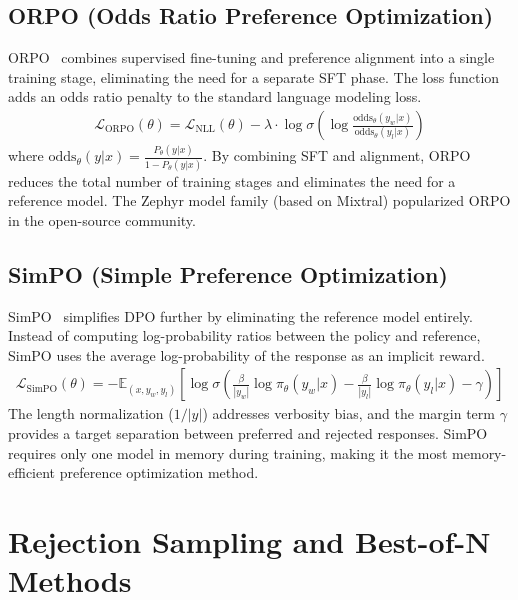 \documentclass[12pt]{article}
\begin{document}
\subsection{ORPO (Odds Ratio Preference Optimization)}

ORPO~\cite{Hong2024ORPO} combines supervised fine-tuning and preference alignment into a single training stage, eliminating the need for a separate SFT phase. The loss function adds an odds ratio penalty to the standard language modeling loss.
\begin{align}
\mathcal{L}_{\text{ORPO}}(\theta) = \mathcal{L}_{\text{NLL}}(\theta) - \lambda \cdot \log \sigma\!\left( \log \frac{\text{odds}_\theta(y_w | x)}{\text{odds}_\theta(y_l | x)} \right)
\end{align}
where $\text{odds}_\theta(y|x) = \frac{P_\theta(y|x)}{1 - P_\theta(y|x)}$. By combining SFT and alignment, ORPO reduces the total number of training stages and eliminates the need for a reference model. The Zephyr model family (based on Mixtral) popularized ORPO in the open-source community.

\subsection{SimPO (Simple Preference Optimization)}

SimPO~\cite{Meng2024SimPO} simplifies DPO further by eliminating the reference model entirely. Instead of computing log-probability ratios between the policy and reference, SimPO uses the average log-probability of the response as an implicit reward.
\begin{align}
\mathcal{L}_{\text{SimPO}}(\theta) = -\mathbb{E}_{(x, y_w, y_l)} \left[ \log \sigma\!\left( \frac{\beta}{|y_w|} \log \pi_\theta(y_w|x) - \frac{\beta}{|y_l|} \log \pi_\theta(y_l|x) - \gamma \right) \right]
\end{align}
The length normalization ($1/|y|$) addresses verbosity bias, and the margin term $\gamma$ provides a target separation between preferred and rejected responses. SimPO requires only one model in memory during training, making it the most memory-efficient preference optimization method.


\section{Rejection Sampling and Best-of-N Methods}
\end{document}
